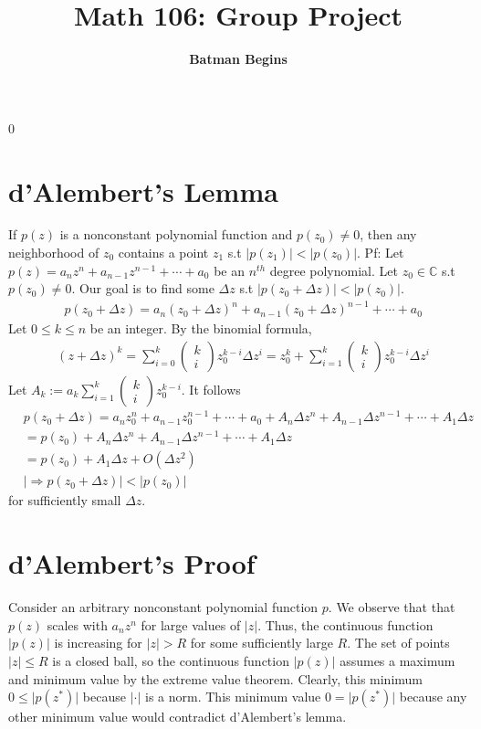 0

\title{\bf Math 106: Group Project}
\author{\bf Batman Begins}

\maketitle
\section*{d'Alembert's Lemma}
If $p(z)$ is a nonconstant polynomial function and $p(z_0)\neq0$, then any neighborhood of $z_0$ contains a point $z_1$ s.t $\lvert p(z_1)\rvert<\lvert p(z_0)\rvert$.
Pf: Let $p(z)=a_n z^n+a_{n-1} z^{n-1}+\cdots+a_0$ be an $n^{th}$ degree polynomial.
 Let $z_0\in\mathbb{C}$ s.t $p(z_0)\neq0$. 
Our goal is to find some $\Delta z$ s.t $\lvert p(z_0+\Delta z)\rvert<\lvert p(z_0)\rvert$.
\begin{align*}
    &p(z_0+\Delta z)=a_n {(z_0+\Delta z)}^n+a_{n-1} {(z_0+\Delta z)}^{n-1}+\cdots+a_0
\end{align*}
Let $0\le k\le n$ be an integer. By the binomial formula,
\begin{align*}
    &{(z+\Delta z)}^k=\sum_{i=0}^{k}\begin{pmatrix}
        k\\
        i
    \end{pmatrix}z_0^{k-i}\Delta z^i =z_0^k+\sum_{i=1}^{k}\begin{pmatrix}
        k\\
        i
    \end{pmatrix}z_0^{k-i}\Delta z^i
\end{align*}
Let $\displaystyle A_k:=a_k\sum_{i=1}^{k}\begin{pmatrix}
    k\\
    i
\end{pmatrix}z_0^{k-i}$. It follows 
\begin{align*}
    &p(z_0+\Delta z)=a_n z_0^n+a_{n-1}z_0^{n-1}+\cdots+a_0+A_n \Delta z^n+A_{n-1} \Delta z^{n-1}+\cdots+A_1 \Delta z\\
    &=p(z_0)+A_n \Delta z^n+A_{n-1} \Delta z^{n-1}+\cdots+A_1 \Delta z\\
    &=p(z_0)+A_1\Delta z+O(\Delta z^2)\\
    &\lvert \Rightarrow p(z_0+\Delta z)\rvert<\lvert p(z_0)\rvert
\end{align*}
for sufficiently small $\Delta z$.
\section*{d'Alembert's Proof}
Consider an arbitrary nonconstant polynomial function $p$. 
We observe that that $p(z)$ scales with $a_n z^n$ for large values of $\lvert z\rvert$. 
Thus, the continuous function $\lvert p(z)\rvert$ is increasing for $\lvert z\rvert>R$ for some sufficiently large $R$.
The set of points $\lvert z\rvert\le R$ is a closed ball, so the continuous function $\lvert p(z)\rvert$ assumes a maximum and minimum value by the extreme value theorem.
Clearly, this minimum $0\le \lvert p(z^*)\rvert$ because $\lvert\cdot\rvert$ is a norm. This minimum value $0= \lvert p(z^*)\rvert$ because any other minimum value would contradict d'Alembert's lemma.
